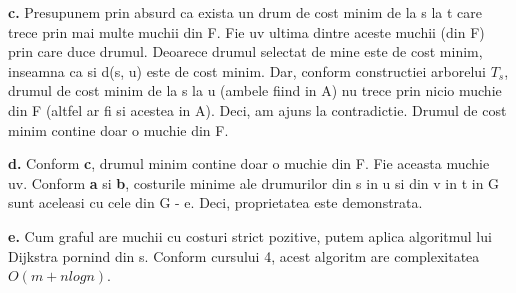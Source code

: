 \documentclass{article}
\begin{document}
{\bf c.} Presupunem prin absurd ca exista un drum de cost minim de la s la t care trece prin mai multe muchii din F. Fie uv ultima dintre aceste muchii (din F) prin care duce drumul. Deoarece drumul selectat de mine este de cost minim, inseamna ca si d(s, u) este de cost minim. Dar, conform constructiei arborelui $T_s$, drumul de cost minim de la s la u (ambele fiind in A) nu trece prin nicio muchie din F (altfel ar fi si acestea in A). Deci, am ajuns la contradictie. Drumul de cost minim contine doar o muchie din F.

{\bf d.} Conform {\bf c}, drumul minim contine doar o muchie din F. Fie aceasta muchie uv. Conform {\bf a} si {\bf b}, costurile minime ale drumurilor din s in u si din v in t in G sunt aceleasi cu cele din G - e. Deci, proprietatea este demonstrata.

{\bf e.} Cum graful are muchii cu costuri strict pozitive, putem aplica algoritmul lui Dijkstra pornind din s. Conform cursului 4, acest algoritm are complexitatea $O(m + nlogn)$.
\end{document}

